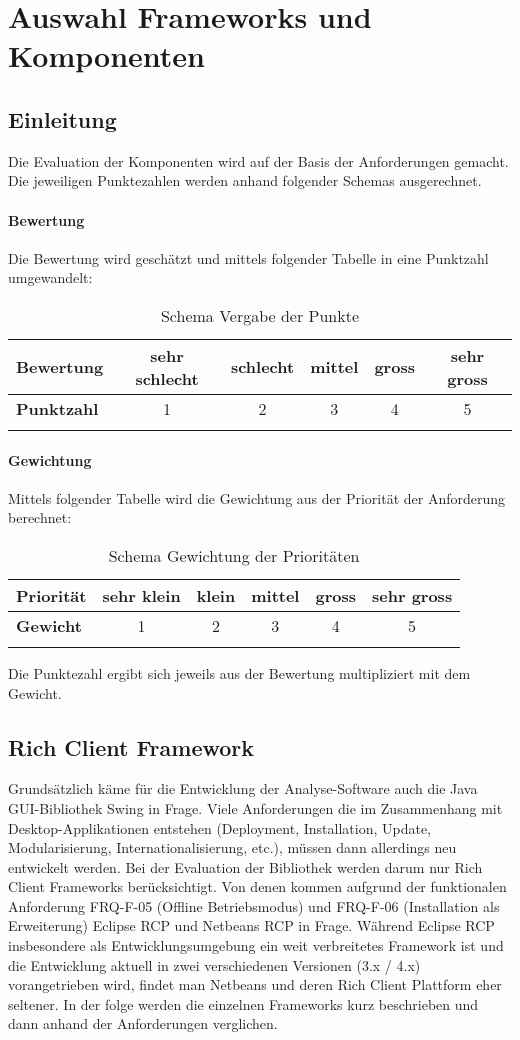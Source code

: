 \chapter{Auswahl Frameworks und Komponenten}\label{selection_rcp_fw}
\section{Einleitung}
Die Evaluation der Komponenten wird auf der Basis der Anforderungen gemacht. Die jeweiligen Punktezahlen werden anhand folgender Schemas ausgerechnet.
\subsubsection{Bewertung}
Die Bewertung wird geschätzt und mittels folgender Tabelle in eine Punktzahl umgewandelt:
\begin{longtable}{|l|c|c|c|c|c|}\hline
 \textbf{Bewertung} & sehr schlecht & schlecht & mittel & gross & sehr gross\\\hline
 \textbf{Punktzahl} & 1 & 2 & 3 & 4 & 5\\\hline
 \caption{Schema Vergabe der Punkte}
\end{longtable}

\subsubsection{Gewichtung}
Mittels folgender Tabelle wird die Gewichtung aus der Priorität der Anforderung berechnet:\begin{longtable}{|l|c|c|c|c|c|}\hline
 \textbf{Priorität} & sehr klein & klein & mittel & gross & sehr gross\\\hline
 \textbf{Gewicht} & 1 & 2 & 3 & 4 & 5\\\hline
 \caption{Schema Gewichtung der Prioritäten}
\end{longtable}

Die Punktezahl ergibt sich jeweils aus der Bewertung multipliziert mit dem Gewicht.



\section{Rich Client Framework}
Grundsätzlich käme für die Entwicklung der Analyse-Software auch die Java GUI-Bibliothek Swing in Frage. Viele Anforderungen die im Zusammenhang mit Desktop-Applikationen entstehen (Deployment, Installation, Update, Modularisierung, Internationalisierung, etc.), müssen dann allerdings neu entwickelt werden. Bei der Evaluation der Bibliothek werden darum nur Rich Client Frameworks berücksichtigt. Von denen kommen aufgrund der funktionalen Anforderung FRQ-F-05 (Offline Betriebsmodus) und FRQ-F-06 (Installation als Erweiterung) Eclipse RCP und Netbeans RCP in Frage. Während Eclipse RCP insbesondere als Entwicklungsumgebung ein weit verbreitetes Framework ist und die Entwicklung aktuell in zwei verschiedenen Versionen (3.x / 4.x) vorangetrieben wird, findet man Netbeans und deren Rich Client Plattform eher seltener. In der folge werden die einzelnen Frameworks kurz beschrieben und dann anhand der Anforderungen verglichen.


